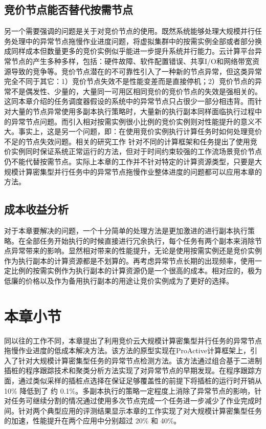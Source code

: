 \subsection{竞价节点能否替代按需节点}
另一个需要强调的问题是关于对竞价节点的使用。既然系统能够处理大规模并行任务处理中的异常节点拖慢作业进度问题，将虚拟集群中的按需实例全部或者部分换成同样成本但数量更多的竞价实例似乎能进一步提升系统并行能力。云计算平台异常节点的产生多种多样，包括：硬件故障、软件配置错误、共享I/O和网络带宽资源导致的竞争等。竞价节点潜在的不可靠性引入了一种新的节点异常，但这类异常完全不同于其它：1）竞价节点失效不是性能变差而是直接停机；2）竞价节点的异常不是偶发性、少量的，大量同一可用区相同竞价的竞价节点的失效是强相关的。这同本章介绍的任务调度器假设的系统中的异常节点只占很少一部分相违背。而针对大量的节点异常使用多副本执行策略时，大量新的执行副本同样面临执行过程中的异常节点问题。而引入相对按需实例很小比例的竞价实例则对性能提升的意义不大。事实上，这是另一个问题，即：在使用竞价实例执行计算任务时如何处理竞价不足的节点失效问题。相关的研究工作 \cite{Liu:2011:CMC:2170444.2170450, Andrzejak:2010:DMC:1906481.1906533} 针对不同的计算框架和任务提出了使用竞价实例同时保证系统正常运行的方法，但对于时间约束较强的工作流场景竞价节点仍不能代替按需节点。实际上本章的工作并不针对特定的计算资源类型，只要是大规模计算密集型并行任务中的异常节点拖慢作业整体进度的问题都可以应用本章的方法。

\subsection{成本收益分析}
对于本章要解决的问题，一个十分简单的处理方法是更加激进的进行副本执行策略。在全部任务开始执行的时候直接进行冗余执行，每个任务有两个副本来消除节点异常带来的影响。显然相对带来的性能提升，无论是使用按需实例还是竞价实例作为执行副本的计算资源都是不划算的。再考虑异常节点长期的出现频率，使用一定比例的按需实例作为执行副本的计算资源仍是一个很高的成本。相对应的，极为低廉的价格以及作为备用执行副本的用途让竞价实例成为了更好的选择。

\section{本章小节}
同以往的工作不同，本章提出了利用竞价云大规模计算密集型并行任务的异常节点拖慢作业进度的低成本解决方法。该方法的原型实现在ProActive计算框架上，引入了针对大规模计算密集型任务的异常节点检测方法。该方法通过组合基于二进制插桩的程序跟踪技术和聚类分析方法实现了对异常节点的早期发现。在程序跟踪方面，通过类似采样的插桩点选择在保证足够覆盖性的前提下将插桩的运行时开销从 10\% 降低到了 约 0.1\%。多副本执行的策略一定程度上消除了异常节点的影响，针对任务可继续分割的情况通过使用多次节点完成一个任务进一步减少了作业完成时间。针对两个典型应用的评测结果显示本章的工作实现了对大规模计算密集型任务的加速，性能提升在两个应用中分别超过 20\% 和 40\%。